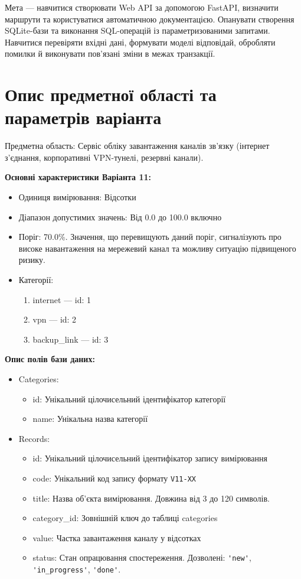 \documentclass[12pt, a4paper]{article}
\begin{document}


Мета --- навчитися створювати Web API за допомогою FastAPI, визначити маршрути та користуватися автоматичною документацією. Опанувати створення SQLite-бази та виконання SQL-операцій із параметризованими запитами. Навчитися перевіряти вхідні дані, формувати моделі відповідай, обробляти помилки й виконувати пов'язані зміни в межах транзакції.
\section{Опис предметної області та параметрів варіанта}
Предметна область: Сервіс обліку завантаження каналів зв'язку (інтернет з'єднання, корпоративні VPN-тунелі, резервні канали).

\textbf{Основні характеристики Варіанта 11:}
\begin{itemize}
	\item Одиниця вимірювання: Відсотки
	\item Діапазон допустимих значень: Від 0.0 до 100.0 включно
	\item Поріг: 70.0\%. Значення, що перевищують даний поріг, сигналізують про високе навантаження на мережевий канал та можливу ситуацію підвищеного ризику.
	\item Категорії:
		\begin{enumerate}
			\item internet --- id: 1
			\item vpn --- id: 2
			\item backup\_link --- id: 3
		\end{enumerate}
\end{itemize}
\textbf{Опис полів бази даних:}
\begin{itemize}
	\item Categories:
		\begin{itemize}
			\item id: Унікальний цілочисельний ідентифікатор категорії
			\item name: Унікальна назва категорії
		\end{itemize}
	\item Records:
		\begin{itemize}
			\item id: Унікальний цілочисельний ідентифікатор запису вимірювання
			\item code: Унікальний код запису формату \verb|V11-XX|
			\item title: Назва об'єкта вимірювання. Довжина від 3 до 120 символів.
			\item category\_id: Зовнішній ключ до таблиці categories
			\item value: Частка завантаження каналу у відсотках
			\item status: Стан опрацювання спостереження. Дозволені: \verb|'new'|, \verb|'in_progress'|, \verb|'done'|.
		\end{itemize}
\end{itemize}
\end{document}
